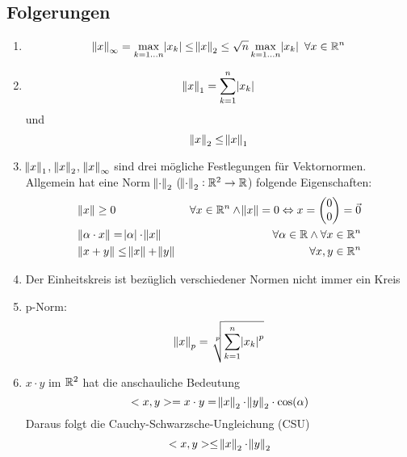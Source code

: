 \subsection{Folgerungen}
\begin{enumerate}
    \item
        \begin{equation*}
            \norm{x}_\infty = \max_{k=1\ldots n} \abs{x_k}
            \leq \norm{x}_2 \leq \sqrt{n} \max_{k=1 \ldots n} \abs{x_k}
            \ \forall x \in \mathbb{R}^n
        \end{equation*}
    \item
        \begin{equation*}
            \norm{x}_1 = \sum_{k=1}^n \abs{x_k}
        \end{equation*}
        und
        \begin{equation*}
            \norm{x}_2 \leq \norm{x}_1
        \end{equation*}
    \item $\norm{x}_1$, $\norm{x}_2$, $\norm{x}_\infty$ sind drei mögliche Festlegungen
        für Vektornormen. Allgemein hat eine Norm $\norm{\cdot}_2$
        ($\norm{\cdot}_2: \mathbb{R}^2 \rightarrow \mathbb{R}$) folgende Eigenschaften:
        \begin{eqnarray*}
            &\norm{x} \geq 0&\ \forall x \in \mathbb{R}^n \land \norm{x}=0 \Leftrightarrow
            x = \begin{pmatrix}
            0 \\ 0
            \end{pmatrix}
            = \vec{0} \\
            &\norm{\alpha \cdot x} = \abs{\alpha} \cdot \norm{x}&\ \forall \alpha
            \in \mathbb{R}\land \forall x \in \mathbb{R}^n \\
            &\norm{x + y} \leq \norm{x} + \norm{y}&\ \forall x, y \in \mathbb{R}^n
        \end{eqnarray*}
    \item Der Einheitskreis ist bezüglich verschiedener Normen nicht immer ein Kreis
    \item p-Norm:
        \begin{equation*}
            \norm{x}_p = \nthSqrt{p}{\sum_{k=1}^n \abs{x_k}^p}
        \end{equation*}
     \item $x \cdot y$ im $\mathbb{R}^2$ hat die anschauliche Bedeutung
        \begin{equation*}
            <x,y> = x \cdot y = \norm{x}_2 \cdot \norm{y}_2 \cdot \cos(\alpha)
        \end{equation*}
        Daraus folgt die Cauchy-Schwarzsche-Ungleichung (CSU)
        \begin{equation*}
            <x,y> \leq \norm{x}_2 \cdot \norm{y}_2
        \end{equation*}
\end{enumerate}

